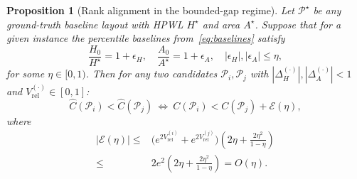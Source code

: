 \documentclass[nolineno]{ieeeaccess}
\newtheorem{proposition}{Proposition}
\begin{document}
\begin{proposition}[Rank alignment in the bounded-gap regime]
\label{prop:alignment}
Let $\mathcal{P}^{\star}$ be any ground-truth baseline layout with HPWL
$H^{\star}$ and area $A^{\star}$. Suppose that for a given instance the
percentile baselines from~\eqref{eq:baselines} satisfy
\begin{equation}
\frac{H_0}{H^{\star}} = 1 + \epsilon_H,\quad
\frac{A_0}{A^{\star}} = 1 + \epsilon_A,\quad
|\epsilon_H|,|\epsilon_A| \le \eta,
\label{eq:bounded-gap}
\end{equation}
for some $\eta \in [0, 1)$. Then for any two candidates $\mathcal{P}_i,
\mathcal{P}_j$ with $|\Delta_H^{(\cdot)}|, |\Delta_A^{(\cdot)}| < 1$ and
$V_{\text{rel}}^{(\cdot)} \in [0,1]$:
\begin{equation}
\widehat{C}(\mathcal{P}_i) < \widehat{C}(\mathcal{P}_j)
\ \Longleftrightarrow\
C(\mathcal{P}_i) < C(\mathcal{P}_j) + \mathcal{E}(\eta),
\label{eq:alignment}
\end{equation}
where
\begin{equation}
\begin{aligned}
|\mathcal{E}(\eta)| \le{}&
\bigl(e^{2V_{\text{rel}}^{(i)}} + e^{2V_{\text{rel}}^{(j)}}\bigr)
\left(2\eta + \frac{2\eta^2}{1-\eta}\right)\\
\le{}& 2e^2\left(2\eta + \frac{2\eta^2}{1-\eta}\right)
= O(\eta).
\end{aligned}
\label{eq:error-bound}
\end{equation}
\end{proposition}
\end{document}
